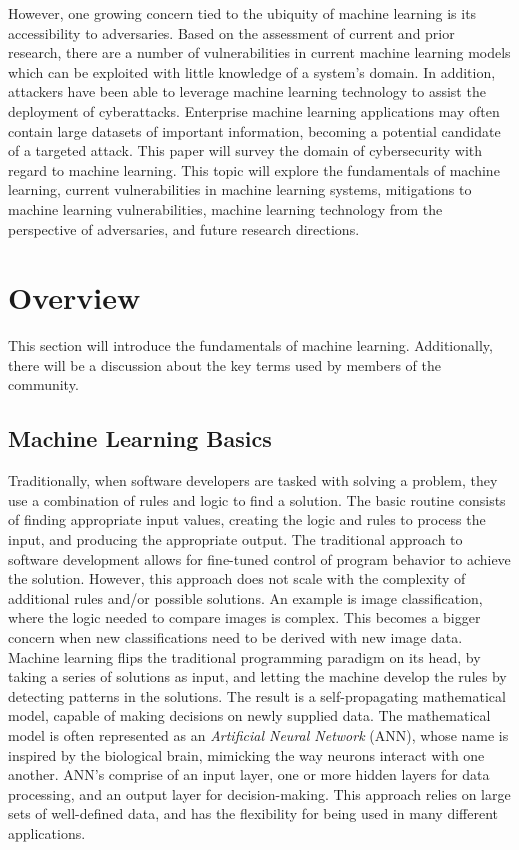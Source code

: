 \documentclass[11pt,conference]{IEEEtran}
\begin{document}
However, one growing concern tied to the ubiquity of machine learning is its 
accessibility to adversaries. Based on the assessment of current and prior
research, there are a number of vulnerabilities in current machine learning
models which can be exploited with little knowledge of a system's domain. In
addition, attackers have been able to leverage machine learning technology to
assist the deployment of cyberattacks. Enterprise machine learning applications
may often contain large datasets of important information, becoming a potential 
candidate of a targeted attack. This paper will survey the domain of
cybersecurity with regard to machine learning. This topic will explore the
fundamentals of machine learning, current vulnerabilities in machine learning
systems, mitigations to machine learning vulnerabilities, machine learning technology from the perspective of adversaries, and
future research directions.

\section{Overview}
This section will introduce the fundamentals of machine learning. Additionally,
there will be a discussion about the key terms used by members of the community.

\subsection{Machine Learning Basics}
Traditionally, when software developers are tasked with solving a problem, they
use a combination of rules and logic to find a solution. The basic
routine consists of finding appropriate input values,
creating the logic and rules to process the input, and producing the appropriate output.
The traditional approach to software development allows for fine-tuned control
of program behavior to achieve the solution. However, this approach does not scale
with the complexity of additional rules and/or possible solutions. An
example is image classification, where the logic needed to compare images
is complex. This becomes a bigger concern when new classifications need to be
derived with new image data. Machine learning flips the traditional programming
paradigm on its head, by taking a series of solutions as input, and
letting the machine develop the rules by detecting patterns in the solutions.
The result is a self-propagating mathematical model, capable of making
decisions on newly supplied data. The mathematical model is often represented
as an \emph{Artificial Neural Network} (ANN), whose name is inspired by the
biological brain, mimicking the way neurons interact with one another. ANN's comprise of an input layer, one
or more hidden layers for data processing, and an output layer for
decision-making. This approach relies on large sets of
well-defined data, and has the flexibility for being used in many different applications.
\end{document}
